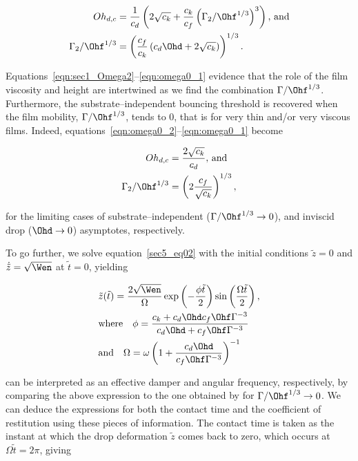 \begin{align}
	\label{eqn:omega0_2}
	Oh_{d,c} &= \frac{1}{c_d}\left(2\sqrt{c_k} + \frac{c_{k}}{c_{f}}\left(\Gamma_2/\Ohf^{1/3}\right)^3\right),\,\text{and}\\
	\label{eqn:omega0_1}
	\Gamma_2/\Ohf^{1/3} &= \left(\frac{c_{f}}{c_{k}}\left( c_{d} \Ohd + 2 \sqrt{c_{k}} \right)\right)^{1/3}.
\end{align}

\noindent Equations~\eqref{eqn:sec1_Omega2}--\eqref{eqn:omega0_1} evidence that the role of the film viscosity and height are intertwined as we find the combination $\Gamma/\Ohf^{1/3}$. Furthermore, the substrate--independent bouncing threshold is recovered when the film mobility, $\Gamma/\Ohf^{1/3}$, tends to 0, that is for very thin and/or very viscous films. Indeed, equations~\eqref{eqn:omega0_2}--\eqref{eqn:omega0_1} become

\begin{align}
	\label{eqn:omega1_2}
	Oh_{d,c} &= \frac{2\sqrt{c_k} }{c_d},\,\text{and}\\
	\label{eqn:omega1_1}
	\Gamma_2/\Ohf^{1/3} &= \left(2\frac{c_{f}}{\sqrt{c_{k}}}\right)^{1/3},
\end{align}

\noindent for the limiting cases of substrate--independent ($\Gamma/\Ohf^{1/3} \to 0$), and inviscid drop ($\Ohd \to 0$) asymptotes, respectively.

To go further, we solve equation~\eqref{sec5_eq02} with the initial conditions $\tilde{z} = 0$ and $\dot{\tilde{z}} = \sqrt{\Wen}$ at $\tilde{t} = 0$, yielding

\begin{align}
	\label{eqn:displacement_Theory}
	&\tilde{z}(\tilde{t}) =  \frac{2 \sqrt{\Wen}} {\Omega}\exp\left(-\frac{\mathcal{\phi} \tilde{t}}{2}\right) \sin\left(\frac{\Omega\tilde{t}}{2}\right),\\
	\label{eqn:displacement_damper}
	&\text{where}\quad\mathcal{\phi} = \frac{c_k + c_d\Ohd c_f\Ohf\Gamma^{-3}}{c_d\Ohd+c_f\Ohf\Gamma^{-3}}\\
	\label{eqn:displacement_pulsation}
	&\text{and}\quad\Omega = \omega\left(1+\frac{c_d\Ohd}{c_f\Ohf\Gamma^{-3}}\right)^{-1}
\end{align}

\noindent can be interpreted as an effective damper and angular frequency, respectively, by comparing the above expression to the one obtained by \citet{jha2020viscous} for $\Gamma/\Ohf^{1/3} \to 0$. We can deduce the expressions for both the contact time and the coefficient of restitution using these pieces of information. The contact time is taken as the instant at which the drop deformation $\tilde{z}$ comes back to zero, which occurs at $\Omega \tilde{t} = 2\pi$, giving

